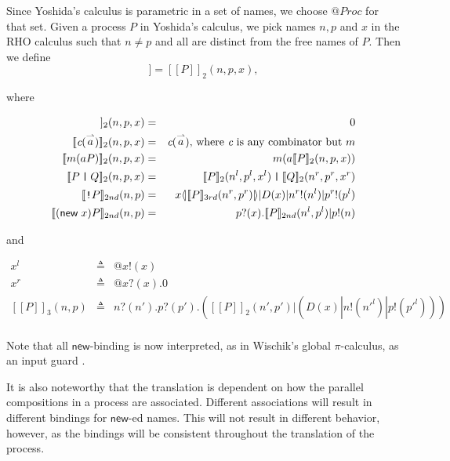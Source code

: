 \documentclass{llncs}
\makeatletter
\newcommand{\new}{\mathsf{new}}
\newcommand{\ldb}{[\![}
\newcommand{\rdb}{]\!]}
\newcommand{\lliftb}{\langle\!|}
\newcommand{\rliftb}{|\!\rangle}
\newcommand{\id}[1]{\texttt{#1}}
\newcommand{\pzero}{\mathbin{0}}
\newcommand{\juxtap}{\mathbin{\id{|}}}
\newcommand{\binpar}[2]{#1 | #2}
\newcommand{\outputp}[2]{#1!(#2)}
\newcommand{\prefix}[3]{#1?(#2) . #3}
\newcommand{\lift}[2]{#1 \lliftb #2 \rliftb}
\newcommand{\quotep}[1]{\mathsf{@}#1}
\newcommand{\meaningof}[1]{\ldb #1 \rdb}
\newcommand{\QProc}{\quotep{\mathbin{Proc}}}
\newcommand{\vect}[1]{\stackrel{\rightharpoonup}{#1}}
\makeatother
\begin{document}
Since Yoshida's calculus is parametric in a set of names, we choose $\QProc$ for that set.
Given a process $P$ in Yoshida's calculus, 
we pick names $n, p$ and $x$ in the RHO calculus such that $n \neq p$ and
all are distinct from the free names of $P$.  Then we define
\begin{equation*}
  \meaningof{P} = \meaningof{P}_2(n, p, x),
\end{equation*}

where

\begin{eqnarray*}
    \meaningof{\pzero}_2 (n,p,x)
      & = &
       \pzero \\
    \meaningof{\emph{c}(\vect{a})}_2 (n,p,x) 
      & = & 
      \emph{c}(\vect{a})\mbox{, where $\emph{c}$ is any combinator but $m$} \\
    \meaningof{m(aP)}_2 (n,p,x) 
      & = & 
          m(a \meaningof{P}_2 (n,p,x)) \\
    \meaningof{P \juxtap Q}_2 (n,p,x) 
      & = & 
    \meaningof{P}_2 (n^l, p^l, x^l)
         \juxtap \meaningof{Q}_2 (n^r, p^r, x^r) \\ 
    \meaningof{\id{!} P}_{2nd} (  n, p )
          & = & \binpar{\lift{x}{\meaningof{P}_{3rd}( n^{r}, p^{r} )}}
         {\binpar{D(x)}{\binpar{\outputp{n^{r}}{n^{l}}}{\outputp{p^{r}}{p^{l}}}}} \\
    \meaningof{(\new \; x ) P}_{2nd} (  n, p ) 
          & = & 
         \prefix{p}{x}{\binpar{\meaningof{P}_{2nd} ( n^{l}, p^{l} )}{\outputp{p}{n}}} \end{eqnarray*}

and

\begin{eqnarray*}
  x^l & \triangleq & \quotep{\outputp{x}{x}} \\
  x^r & \triangleq & \quotep{\prefix{x}{x}{\pzero}} \\
  \meaningof{P}_3(n, p) 
    & \triangleq & 
      \prefix{n}{n'}{\prefix{p}{p'}{(\binpar{\meaningof{P}_2(n',p')}
        {(\binpar{D(x)}{\binpar{\outputp{n}{n'^l}}{\outputp{p}{p'^l}}})})}} \\
\end{eqnarray*}

  Note that all $\new$-binding is now interpreted, as in Wischik's
  global $\pi$-calculus, as an input guard \cite{globalpi}.
  
  It is also noteworthy that the translation is dependent on how
  the parallel compositions in a process are
  associated. Different associations will result in different
  bindings for $\new$-ed names. This will not result in different
  behavior, however, as the bindings will be consistent
  throughout the translation of the process.
\end{document}
